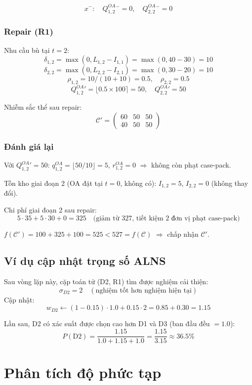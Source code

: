 \documentclass[12pt]{article}
\newcommand{\QOA}{Q^{OA}}
\newcommand{\qOA}{q^{OA}}
\newcommand{\rOA}{r^{OA}}
\begin{document}
\[
x^- : \quad \QOA_{1,2}^- = 0, \quad \QOA_{2,2}^- = 0
\]

\subsubsection*{Repair (R1)} Nhu cầu bù tại $t=2$:
\[
\delta_{1,2} = \max(0, L_{1,2} - I_{1,1}) = \max(0, 40 - 30) = 10
\]
\[
\delta_{2,2} = \max(0, L_{2,2} - I_{2,1}) = \max(0, 30 - 20) = 10
\]
\[
\rho_{1,2} = 10/(10+10) = 0.5, \quad \rho_{2,2} = 0.5
\]
\[
\QOA_{1,2}' = \lfloor 0.5 \times 100 \rceil = 50, \quad \QOA_{2,2}' = 50
\]

Nhiễm sắc thể sau repair:
\[
\mathcal{C}' =
\begin{pmatrix}
60 & 50 & 50 \\
40 & 50 & 50
\end{pmatrix}
\]

\subsubsection*{Đánh giá lại} Với $\QOA_{1,2}' = 50$: $\qOA_{1,2} = \lfloor 50/10 \rfloor = 5$, $\rOA_{1,2} = 0$ $\Rightarrow$ không còn phạt case-pack.

Tồn kho giai đoạn 2 (OA đặt tại $t=0$, không có): $I_{1,2} = 5$, $I_{2,2} = 0$ (không thay đổi).

Chi phí giai đoạn 2 sau repair:
\[
5\cdot35 + 5\cdot30 + 0 = 325 \quad \text{(giảm từ 327, tiết kiệm 2 đơn vị phạt case-pack)}
\]

$f(\mathcal{C}') = 100 + 325 + 100 = 525 < 527 = f(\mathcal{C})$ $\Rightarrow$ chấp nhận $\mathcal{C}'$.

\subsection{Ví dụ cập nhật trọng số ALNS}

Sau vòng lặp này, cặp toán tử (D2, R1) tìm được nghiệm cải thiện:
\[
\sigma_{D2} = 2 \quad (\text{nghiệm tốt hơn nghiệm hiện tại})
\]
Cập nhật:
\[
w_{D2} \gets (1 - 0.15) \cdot 1.0 + 0.15 \cdot 2 = 0.85 + 0.30 = 1.15
\]

Lần sau, D2 có xác suất được chọn cao hơn D1 và D3 (ban đầu đều $= 1.0$):
\[
P(\text{D2}) = \frac{1.15}{1.0 + 1.15 + 1.0} = \frac{1.15}{3.15} \approx 36.5\%
\]



\section{Phân tích độ phức tạp}
\end{document}

